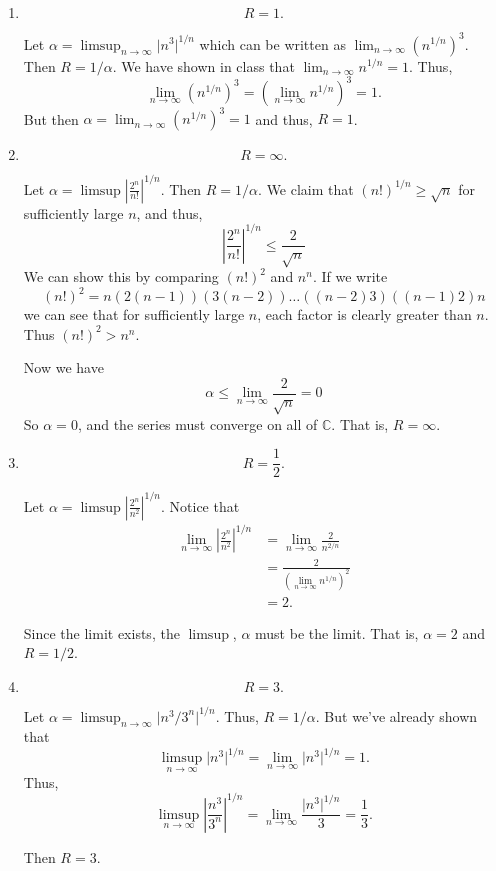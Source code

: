 \documentclass[12 pt, letterpaper]{hmcpset}
\begin{document}
\begin{solution}
	\begin{enumerate}
		\item
			\[
				\boxed{
					R = 1.
				}
			\]

			Let $\alpha = \limsup_{n \to \infty} \lvert n^{3} \rvert^{1/n}$ which can be written as $\lim_{n \to \infty} (n^{1/n})^{3}$. Then $R = 1/\alpha$. We have shown in class that $\lim_{n \to \infty} n^{1/n} = 1$. Thus,
			\[
				\lim_{n \to \infty} (n^{1/n})^{3} = (\lim_{n \to \infty} n^{1/n})^{3} = 1. 
			\]
			But then $\alpha = \lim_{n \to \infty} (n^{1/n})^{3} = 1$ and thus, $R = 1$.
		\item
			\[
				\boxed{
					R = \infty.
				}
			\]

			Let $\alpha = \limsup \left \lvert \frac{2^{n}}{n!} \right \rvert^{1/n}$. Then $R = 1/\alpha$. We claim that $(n!)^{1/n} \ge \sqrt{n}$ for sufficiently large $n$, and thus,
			\[
				\left \lvert \frac{2^{n}}{n!} \right \rvert^{1/n} \le \frac{2}{\sqrt{n}}
			\]
			We can show this by comparing $(n!)^{2}$ and $n^{n}$. If we write
			\[
				(n!)^{2} = n (2(n - 1)) (3(n - 2)) \dots ((n - 2) 3) ((n - 1) 2) n
			\]
			we can see that for sufficiently large $n$, each factor is clearly greater than $n$. Thus $(n!)^{2} > n^{n}$.

			Now we have
			\[
				\alpha \le \lim_{n \to \infty} \frac{2}{\sqrt{n}} = 0
			\]
			So $\alpha = 0$, and the series must converge on all of $\mathbb{C}$. That is, $R = \infty$.
		\item
			\[
				\boxed{
					R = \frac{1}{2}.
				}
			\]

			Let $\alpha = \limsup \left \lvert \frac{2^{n}}{n^{2}} \right \rvert^{1/n}$. Notice that
			\[
				\begin{split}
					\lim_{n \to \infty} \left \lvert \frac{2^{n}}{n^{2}} \right \rvert^{1/n} & = \lim_{n \to \infty} \frac{2}{n^{2/n}} \\
														 & = \frac{2}{(\lim_{n \to \infty} n^{1/n})^{2}} \\
														 & = 2.
				\end{split}
			\]

			Since the limit exists, the $\limsup$, $\alpha$ must be the limit. That is, $\alpha = 2$ and $R = 1/2$.
		\item
			\[
				\boxed{
					R = 3.
				}
			\]

			Let $\alpha = \limsup_{n \to \infty} \lvert n^{3}/3^{n} \rvert^{1/n}$. Thus, $R = 1/\alpha$. But we've already shown that
			\[
				\limsup_{n \to \infty} \lvert n^{3} \rvert^{1/n} = \lim_{n \to \infty} \lvert n^{3} \rvert^{1/n} = 1.
			\]
			Thus,
			\[
				\limsup_{n \to \infty} \left \lvert \frac{n^{3}}{3^{n}} \right \rvert^{1/n} = \lim_{n \to \infty} \frac{\lvert n^{3} \rvert^{1/n}}{3} = \frac{1}{3}.
			\]
			
			Then $R = 3$.
	\end{enumerate}
\end{solution}
\end{document}
